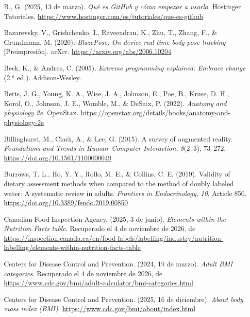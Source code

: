 \begin{referenciasapa}
\item B., G. (2025, 13 de marzo). \textit{Qué es GitHub y cómo empezar a usarlo}. Hostinger Tutoriales. \url{https://www.hostinger.com/es/tutoriales/que-es-github}

\item Bazarevsky, V., Grishchenko, I., Raveendran, K., Zhu, T., Zhang, F., \& Grundmann, M. (2020). \textit{BlazePose: On-device real-time body pose tracking} [Preimpresión]. arXiv. \url{https://arxiv.org/abs/2006.10204}

\item Beck, K., \& Andres, C. (2005). \textit{Extreme programming explained: Embrace change} (2.ª ed.). Addison-Wesley.

\item Betts, J. G., Young, K. A., Wise, J. A., Johnson, E., Poe, B., Kruse, D. H., Korol, O., Johnson, J. E., Womble, M., \& DeSaix, P. (2022). \textit{Anatomy and physiology 2e}. OpenStax. \url{https://openstax.org/details/books/anatomy-and-physiology-2e}

\item Billinghurst, M., Clark, A., \& Lee, G. (2015). A survey of augmented reality. \textit{Foundations and Trends in Human--Computer Interaction, 8}(2--3), 73--272. \url{https://doi.org/10.1561/1100000049}

\item Burrows, T. L., Ho, Y. Y., Rollo, M. E., \& Collins, C. E. (2019). Validity of dietary assessment methods when compared to the method of doubly labeled water: A systematic review in adults. \textit{Frontiers in Endocrinology, 10}, Article 850. \url{https://doi.org/10.3389/fendo.2019.00850}

\item Canadian Food Inspection Agency. (2025, 3 de junio). \textit{Elements within the Nutrition Facts table}. Recuperado el 4 de noviembre de 2026, de \url{https://inspection.canada.ca/en/food-labels/labelling/industry/nutrition-labelling/elements-within-nutrition-facts-table}

\item Centers for Disease Control and Prevention. (2024, 19 de marzo). \textit{Adult BMI categories}. Recuperado el 4 de noviembre de 2026, de \url{https://www.cdc.gov/bmi/adult-calculator/bmi-categories.html}

\item Centers for Disease Control and Prevention. (2025, 16 de diciembre). \textit{About body mass index (BMI)}. \url{https://www.cdc.gov/bmi/about/index.html}


\end{referenciasapa}

